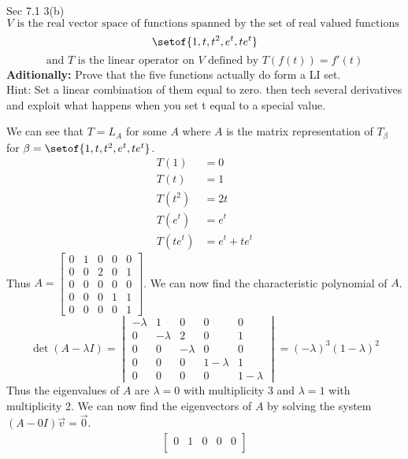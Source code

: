 \documentclass[answers,12pt,addpoints]{exam}
\begin{document}
\begin{questions}
    \question Sec 7.1 3(b)
    $$ V \text{ is the real vector space of functions spanned by the set of real valued functions }$$
    $$\setof{1, t, t^2, e^t, te^t}$$
    $$\text{and } T \text{ is the linear operator on } V \text{ defined by } T(f(t)) = f'(t)$$
    \textbf{Aditionally:} Prove that the five functions actually do form a LI set.\\
    Hint: Set a linear combination of them equal to zero. then tech several derivatives and exploit what happens when you set t equal to a special value.
    \begin{solution}
        We can see that $T = L_A$ for some $A$ where $A$ is the matrix representation of $T_\beta$ for $\beta = \setof{1, t, t^2, e^t, te^t}$.
        \begin{align*}
            T(1) &= 0\\
            T(t) &= 1\\
            T(t^2) &= 2t\\
            T(e^t) &= e^t\\
            T(te^t) &= e^t + te^t
        \end{align*}
        Thus $A = \begin{bmatrix}
            0 & 1 & 0 & 0 & 0 \\
            0 & 0 & 2 & 0 & 1 \\
            0 & 0 & 0 & 0 & 0 \\
            0 & 0 & 0 & 1 & 1 \\
            0 & 0 & 0 & 0 & 1
        \end{bmatrix}$. We can now find the characteristic polynomial of $A$.
        $$\det(A - \lambda I) = \begin{vmatrix}
            -\lambda & 1 & 0 & 0 & 0 \\
            0 & -\lambda & 2 & 0 & 1 \\
            0 & 0 & -\lambda & 0 & 0 \\
            0 & 0 & 0 & 1 - \lambda & 1 \\
            0 & 0 & 0 & 0 & 1 - \lambda
        \end{vmatrix} = (-\lambda)^3 (1-\lambda)^2$$
        Thus the eigenvalues of $A$ are $\lambda = 0$ with multiplicity 3 and $\lambda = 1$ with multiplicity 2. We can now find the eigenvectors of $A$ by solving the system $(A - 0I)\vec{v} = \vec{0}$.
        \begin{align*}
            \begin{bmatrix}
                0 & 1 & 0 & 0 & 0 \\

\end{bmatrix}
\end{align*}
\end{solution}
\end{questions}
\end{document}
